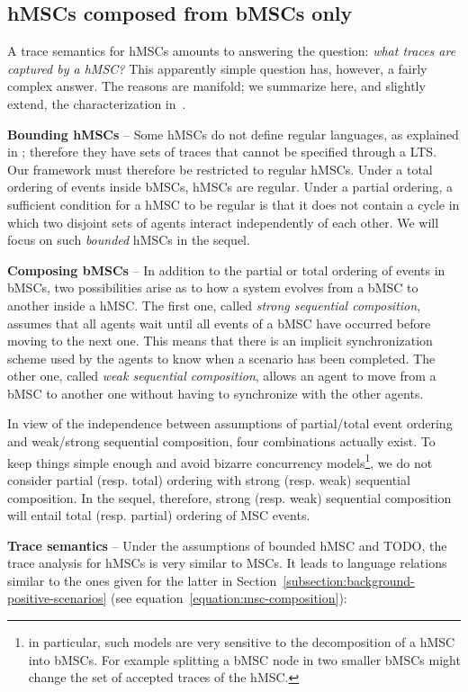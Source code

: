 \subsection*{hMSCs composed from bMSCs only}

A trace semantics for hMSCs amounts to answering the question: \emph{what traces are captured by a hMSC?} This apparently simple question has, however, a fairly complex answer. The reasons are manifold; we summarize here, and slightly extend, the characterization in~\cite{Uchitel:2004}.

\noindent \textbf{Bounding hMSCs} -- Some hMSCs do not define regular languages, as explained in \cite{Henriksen:2000}; therefore they have sets of traces that cannot be specified through a LTS. Our framework must therefore be restricted to regular hMSCs. Under a total ordering of events inside bMSCs, hMSCs are regular. Under a partial ordering, a sufficient condition for a hMSC to be regular is that it does not contain a cycle in which two disjoint sets of agents interact independently of each other. We will focus on such \emph{bounded} hMSCs in the sequel.

\noindent \textbf{Composing bMSCs} -- In addition to the partial or total ordering of events in bMSCs, two possibilities arise as to how a system evolves from a bMSC to another inside a hMSC. The first one, called \emph{strong sequential composition}, assumes that all agents wait until all events of a bMSC have occurred before moving to the next one. This means that there is an implicit synchronization scheme used by the agents to know when a scenario has been completed. The other one, called \emph{weak sequential composition}, allows an agent to move from a bMSC to another one without having to synchronize with the other agents. 

In view of the independence between assumptions of partial/total event ordering and weak/strong sequential composition, four combinations actually exist. To keep things simple enough and avoid bizarre concurrency models\footnote{in particular, such models are very sensitive to the decomposition of a hMSC into bMSCs. For example splitting a bMSC node in two smaller bMSCs might change the set of accepted traces of the hMSC.}, we do not consider partial (resp. total) ordering with strong (resp. weak) sequential composition. In the sequel, therefore, strong (resp. weak) sequential composition will entail total (resp. partial) ordering of MSC events.

\noindent \textbf{Trace semantics} -- Under the assumptions of bounded hMSC and TODO, the trace analysis for hMSCs is very similar to MSCs. It leads to language relations similar to the ones given for the latter in Section~\ref{subsection:background-positive-scenarios} (see equation~\ref{equation:msc-composition}):

